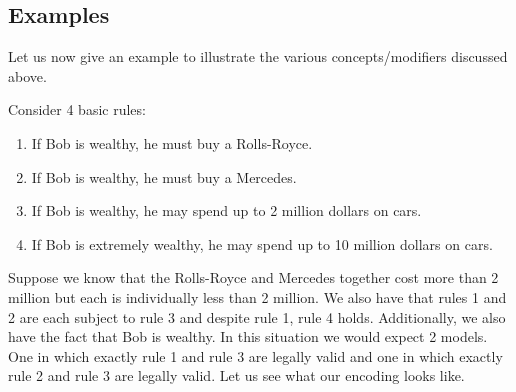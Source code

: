 \subsection{Examples}
Let us now give an example to illustrate the various concepts/modifiers discussed above.


Consider 4 basic rules:
\begin{enumerate}
  \item If Bob is wealthy, he must buy a Rolls-Royce.
  \item If Bob is wealthy, he must buy a Mercedes.
  \item If Bob is wealthy, he may spend up to 2 million dollars on cars.
  \item If Bob is extremely wealthy, he may spend up to 10 million dollars on cars.
\end{enumerate}
    
Suppose we know that the Rolls-Royce and Mercedes together cost more
than 2 million but each is individually less than 2 million. We also
have that rules 1 and 2 are each subject to rule 3 and despite rule 1,
rule 4 holds. Additionally, we also have the fact that Bob is
wealthy. In this situation we would expect 2 models. One in which
exactly rule 1 and rule 3 are legally valid and one in which exactly
rule 2 and rule 3 are legally valid. Let us see what our encoding
looks like.

